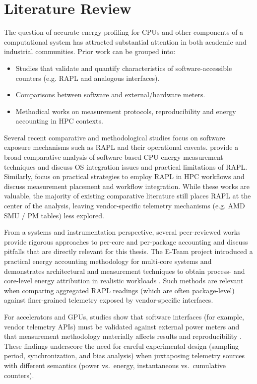 \section{Literature Review}

The question of accurate energy profiling for \gls{CPU}s and other components
of a computational system has attracted substantial attention in both
academic and industrial communities. Prior work can be grouped into:
\begin{itemize}
  \item Studies that validate and quantify characteristics of
    software-accessible counters (e.g. \gls{RAPL} and analogous interfaces).
  \item Comparisons between software and external/hardware meters.
  \item Methodical works on measurement protocols, reproducibility and energy
    accounting in \gls{HPC} contexts.
\end{itemize}

Several recent comparative and methodological studies focus on software
exposure mechanisms such as \gls{RAPL} and their operational caveats.
\textcite{SoftMeasComp} provide a broad comparative analysis of
software-based \gls{CPU} energy measurement techniques and discuss OS
integration issues and practical limitations of \gls{RAPL}. Similarly,
\textcite{RAPL_Strategies} focus on practical strategies to employ
\gls{RAPL} in \gls{HPC} workflows and discuss measurement placement and
workflow integration. While these works are valuable, the majority of existing
comparative literature still places \gls{RAPL} at the center of the analysis,
leaving vendor-specific telemetry mechanisms (e.g. AMD \gls{SMU} / \gls{PM}
tables) less explored.

From a systems and instrumentation perspective, several peer-reviewed
works provide rigorous approaches to per-core and per-package accounting
and discuss pitfalls that are directly relevant for this thesis. The
E-Team project introduced a practical energy accounting methodology for
multi-core systems and demonstrates architectural and measurement
techniques to obtain process- and core-level energy attribution in
realistic workloads \parencite{ETeam_2017}. Such methods are relevant
when comparing aggregated \gls{RAPL} readings (which are often package-level)
against finer-grained telemetry exposed by vendor-specific interfaces.

For accelerators and \gls{GPU}s, studies show that software interfaces (for
example, vendor telemetry APIs) must be validated against external
power meters and that measurement methodology materially affects
results and reproducibility \parencite{You_2023_Zeus}. These findings
underscore the need for careful experimental design (sampling period,
synchronization, and bias analysis) when juxtaposing telemetry sources
with different semantics (power vs.\ energy, instantaneous vs.\
cumulative counters).

